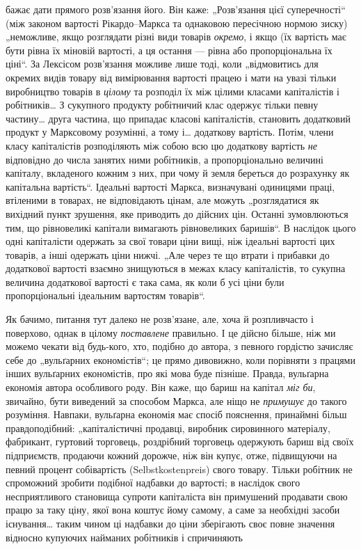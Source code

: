 \parcont{}  %
бажає дати прямого розв’язання його. Він каже: „Розв’язання
цієї суперечності“ (між законом вартості Рікардо--Маркса та однаковою
пересічною нормою зиску) „неможливе, якщо розглядати
різні види товарів \emph{окремо}, і якщо (їх вартість має бути
рівна їх міновій вартості, а ця остання — рівна або пропорціональна
їх ціні“. За Лексісом розв’язання можливе лише тоді,
коли „відмовитись для окремих видів товару від вимірювання
вартості працею і мати на увазі тільки виробництво товарів
в \emph{цілому} та розподіл їх між цілими класами капіталістів і робітників\dots{}
З сукупного продукту робітничий клас одержує тільки
певну частину\dots{} друга частина, що припадає класові капіталістів,
становить додатковий продукт у Марксовому розумінні, а тому і\dots{}
додаткову вартість. Потім, члени класу капіталістів розподіляють
між собою всю цю додаткову вартість \emph{не} відповідно до числа
занятих ними робітників, а пропорціонально величині капіталу,
вкладеного кожним з них, при чому й земля береться до розрахунку
як капітальна вартість“. Ідеальні вартості Маркса, визначувані
одиницями праці, втіленими в товарах, не відповідають
цінам, але можуть „розглядатися як вихідний пункт зрушення,
яке приводить до дійсних цін. Останні зумовлюються тим, що
рівновеликі капітали вимагають рівновеликих баришів“. В наслідок
цього одні капіталісти одержать за свої товари ціни вищі,
ніж ідеальні вартості цих товарів, а інші одержать ціни нижчі.
„Але через те що втрати і прибавки до додаткової вартості
взаємно знищуються в межах класу капіталістів, то сукупна
величина додаткової вартості є така сама, як коли б усі ціни
були пропорціональні ідеальним вартостям товарів“.

Як бачимо, питання тут далеко не розв’язане, але, хоча й
розпливчасто і поверхово, однак в цілому \emph{поставлене} правильно.
І це дійсно більше, ніж ми можемо чекати від будь-кого,
хто, подібно до автора, з певного гордістю зачисляє себе
до „вульґарних економістів“; це прямо дивовижно, коли порівняти
з працями інших вульґарних економістів, про які мова буде
пізніше. Правда, вульґарна економія автора особливого роду.
Він каже, що бариш на капітал \emph{міг би}, звичайно, бути виведений
за способом Маркса, але ніщо не \emph{примушує} до такого розуміння.
Навпаки, вульґарна економія має спосіб пояснення, принаймні
більш правдоподібний: „капіталістичні продавці, виробник
сировинного матеріалу, фабрикант, гуртовий торговець,
роздрібний торговець одержують бариш від своїх підприємств,
продаючи кожний дорожче, ніж він купує, отже, підвищуючи
на певний процент собівартість (Selbstkostenpreis) свого товару.
Тільки робітник не спроможний зробити подібної надбавки до
вартості; в наслідок свого несприятливого становища супроти
капіталіста він примушений продавати свою працю за таку ціну,
якої вона коштує йому самому, а саме за необхідні засоби існування\dots{}
таким чином ці надбавки до ціни зберігають своє повне
значення відносно купуючих найманих робітників і спричиняють
\parbreak{}  %
